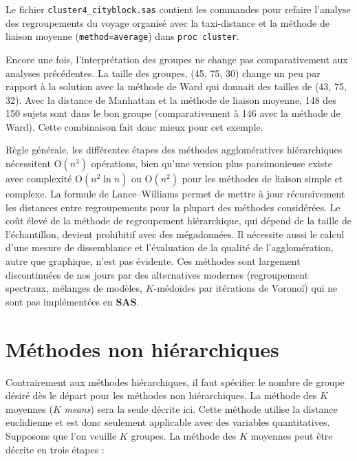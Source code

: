 \documentclass[
  11pt,
  letterpaper,
]{book}
\theoremstyle{definition}
\theoremstyle{definition}
\theoremstyle{definition}
\theoremstyle{remark}
\begin{document}
Le fichier \texttt{cluster4\_cityblock.sas} contient les commandes pour refaire l'analyse des regroupements du voyage organisé avec la taxi-distance et la méthode de liaison moyenne (\texttt{method=average}) dans \texttt{proc\ cluster}.

Encore une fois, l'interprétation des groupes ne change pas comparativement aux analyses précédentes. La taille des groupes, (45, 75, 30) change un peu par rapport à la solution avec la méthode de Ward qui donnait des tailles de (43, 75, 32). Avec la distance de Manhattan et la méthode de liaison moyenne, 148 des 150 sujets sont dans le bon groupe (comparativement à 146 avec la méthode de Ward). Cette combinaison fait donc mieux pour cet exemple.

Règle générale, les différentes étapes des méthodes agglomératives hiérarchiques nécessitent \(\mathrm{O}(n^3)\) opérations, bien qu'une version plus parsimonieuse existe avec complexité \(\mathrm{O}(n^2\ln n)\) ou \(\mathrm{O}(n^2)\) pour les méthodes de liaison simple et complexe. La formule de Lance--Williams permet de mettre à jour récursivement les distances entre regroupements pour la plupart des méthodes considérées. Le coût élevé de la méthode de regroupement hiérarchique, qui dépend de la taille de l'échantillon, devient prohibitif avec des mégadonnées. Il nécessite aussi le calcul d'une mesure de dissemblance et l'évaluation de la qualité de l'agglomération, autre que graphique, n'est pas évidente. Ces méthodes sont largement discontinuées de nos jours par des alternatives modernes (regroupement spectraux, mélanges de modèles, \(K\)-médoïdes par itérations de Voronoï) qui ne sont pas implémentées en \textbf{SAS}.

\hypertarget{muxe9thodes-non-hiuxe9rarchiques}{%
\section{Méthodes non hiérarchiques}\label{muxe9thodes-non-hiuxe9rarchiques}}

Contrairement aux méthodes hiérarchiques, il faut spécifier le nombre de groupe désiré dès le départ pour les méthodes non hiérarchiques. La méthode des \(K\) moyennes (\(K\) \emph{means}) sera la seule décrite ici. Cette méthode utilise la distance euclidienne et est donc seulement applicable avec des variables quantitatives. Supposons que l'on veuille \(K\) groupes. La méthode des \(K\) moyennes peut être décrite en trois étapes :
\end{document}

